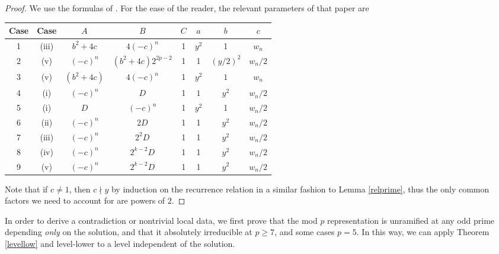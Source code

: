 \documentclass[12pt]{amsart}
\theoremstyle{definition}
\newcommand{\notdiv}{\nmid}
\begin{document}
\begin{proof}
We use the formulas of \cite{bennett04}.  For the ease of the reader, the relevant parameters of that paper are 
\begin{center} 
\begin{tabular}{c | c | c | c | c | c | c | c}
Case & \cite{bennett04} Case & $A$ & $B$ & $C$ & $a$ & $b$ & $c$ \\ \hline \hline
1 & (iii) & $b^2+4c$ & $4(-c)^n$ & 1 & $y^2$ & 1 & $w_n$ \\ \hline
2 & (v) & $(-c)^n$ & $(b^2+4c)2^{2p-2}$ & 1 & 1 & $(y/2)^2$ & $w_n/2$ \\ \hline
3 & (v) & $(b^2+4c)$ & $4(-c)^n$ & 1 & $y^2$ & $1$ & $w_n$ \\ \hline
4 & (i) & $(-c)^n$ & $D$ & 1 & $1$ & $y^2$ & $w_n/2$ \\ \hline
5 & (i) & $D$ & $(-c)^n$ & 1 & $y^2$ & 1 & $w_n/2$ \\ \hline
6 & (ii) & $(-c)^n$ & $2D$ & 1 & 1 & $y^2$ & $w_n/2$ \\ \hline
7 & (iii) & $(-c)^n$ & $2^2D$ & 1 & 1 & $y^2$ & $w_n/2$ \\ \hline
8 & (iv) & $(-c)^n$ & $2^{k-2}D$ & 1 & 1 & $y^2$ & $w_n/2$ \\ \hline
9 & (v) & $(-c)^n$ & $2^{k-2}D$ & 1 & 1 & $y^2$ & $w_n/2$ \\ \hline
\end{tabular}
\end{center}
Note that if $c \neq 1$, then $c \notdiv y$ by induction on the recurrence relation in a similar fashion to Lemma \ref{relprime}, thus the only common factors we need to account for are powers of $2$.
\end{proof}

In order to derive a contradiction or nontrivial local data, we first prove that the mod $p$ representation is unramified at any odd prime depending \emph{only} on the solution, and that it absolutely irreducible at $p \geq 7$, and some cases $p=5$.  In this way, we can apply Theorem \ref{levellow} and level-lower to a level independent of the solution.  
\end{document}
